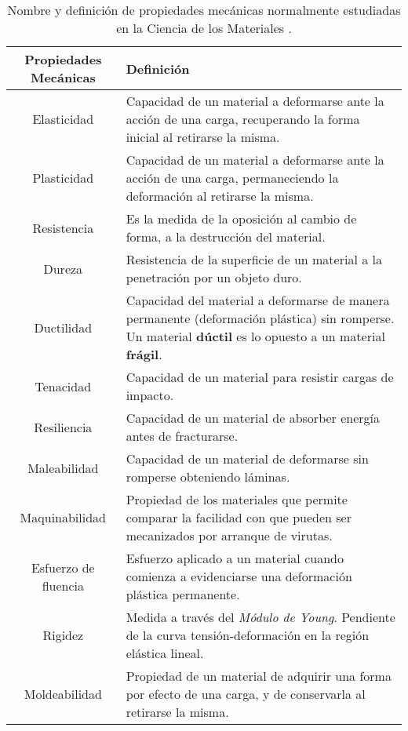 \begin{table}[htp]
\begin{center}
\begin{tabular}{c C{10cm}}
\hline
\textbf{Propiedades Mecánicas} & \textbf{Definición} \\ \hline
 \hline

Elasticidad &
Capacidad de un material a deformarse ante la acción de una carga, recuperando la forma inicial al retirarse la misma. \\ \hline
 
Plasticidad &
Capacidad de un material a deformarse ante la acción de una carga, permaneciendo la deformación al retirarse la misma. \\ \hline 
 
Resistencia & 
Es la medida de la oposición al cambio de forma, a la destrucción del material. \\ \hline

Dureza & 
Resistencia de la superficie de un material a la penetración por un objeto duro.\\ \hline

Ductilidad & 
Capacidad del material a deformarse de manera permanente (deformación plástica) sin romperse. Un material \textbf{dúctil} es lo opuesto a un material \textbf{frágil}. \\ \hline

Tenacidad & 
Capacidad de un material para resistir cargas de impacto. \\ \hline

Resiliencia &
Capacidad de un material de absorber energía antes de fracturarse. \\ \hline

Maleabilidad & 
Capacidad de un material de deformarse sin romperse obteniendo láminas. \\ \hline

Maquinabilidad &
Propiedad de los materiales que permite comparar la facilidad con que pueden ser mecanizados por arranque de virutas. \\ \hline

Esfuerzo de fluencia & 
Esfuerzo aplicado a un material cuando comienza a evidenciarse una deformación plástica permanente.\\ \hline

Rigidez & 
Medida a través del \textit{Módulo de Young}. Pendiente de la curva tensión-deformación en la región elástica lineal. \\ \hline

Moldeabilidad &
Propiedad de un material de adquirir una forma por efecto de una carga, y de conservarla al retirarse la misma. \\ \hline

\end{tabular}
\end{center}
\caption[Nombre y definición de propiedades mecánicas]{Nombre y definición de propiedades mecánicas normalmente estudiadas en la Ciencia de los Materiales \citep{askeland98}.}
\label{C1:tbl:propiedades}
\end{table}

